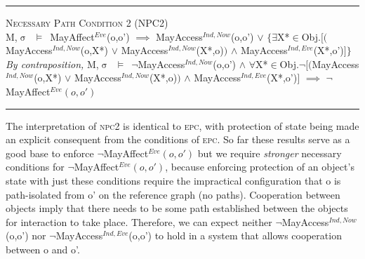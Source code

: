 \documentclass[a4paper,11pt, twoside,twocolumn]{article}
\newenvironment{logic}[1][null]
{\begin{flushleft} \small \label{#1}}
{\end{flushleft}}
\newcommand{\loin}{$\in$}
\newcommand{\loforall}{$\forall$}
\newcommand{\loexists}{$\exists$}
\newcommand{\loand}{$\land$}
\newcommand{\loor} {$\lor$}
\newcommand{\loimplies}{$\implies$}
\newcommand{\losigma}{$\upsigma$}
\newcommand{\loturns} {$\vDash$}
\newcommand{\loneg}{$\neg$}
\newcommand{\ablock} {\null\qquad}
\begin{document}
\begin{logic}
\hrule\null
\textsc{\normalsize *Necessary Path Condition 2 (NPC2)}\\
M,\losigma\ \loturns\ MayAffect$^{Eve}$(o,o')\linebreak
\ablock \loimplies\linebreak
\ablock MayAccess$^{Ind,Now}$(o,o')\linebreak
\ablock \loor\linebreak
\ablock $\{$\loexists X*\loin Obj.$[($MayAccess$^{Ind,Now}$(o,X*) \loor \linebreak
\ablock \ablock \ablock \ablock MayAccess$^{Ind,Now}$(X*,o)$)$\linebreak
\ablock \ablock \ablock \ablock \loand \linebreak
\ablock \ablock \ablock \ablock MayAccess$^{Ind,Eve}$(X*,o')$]\}$
\linebreak \\
\textit{By contraposition,}\linebreak
M,\losigma\ \loturns\ 
\loneg MayAccess$^{Ind,Now}$(o,o')\linebreak
\ablock \loand\linebreak
\ablock \loforall X*\loin Obj.\loneg$[($MayAccess$^{Ind,Now}$(o,X*) \loor \linebreak
\ablock \ablock \ablock \ablock MayAccess$^{Ind,Now}$(X*,o)$)$\linebreak
\ablock \ablock \ablock \ablock \loand \linebreak
\ablock \ablock \ablock \ablock MayAccess$^{Ind,Eve}$(X*,o')$]$\linebreak
\ablock \loimplies\linebreak
	\ablock\loneg MayAffect$^{Eve}(o,o')$\linebreak
\hrule
\end{logic}
The interpretation of \textsc{npc2} is identical to \textsc{epc}, with protection of state being made an explicit consequent from the conditions of \textsc{epc}.
So far these results serve as a good base to enforce \loneg MayAffect$^{Eve}(o,o')$ but we require \textit{stronger} necessary conditions for \loneg MayAffect$^{Eve}(o,o')$, because enforcing protection of an object's state with just these conditions require the impractical configuration that o is path-isolated from o' on the reference graph (no paths). Cooperation between objects imply that there needs to be some path established between the objects for interaction to take place. Therefore, we can expect neither \loneg MayAccess$^{Ind,Now}$(o,o') nor \loneg MayAccess$^{Ind,Eve}$(o,o') to hold in a system that allows cooperation between o and o'.\\
\end{document}
